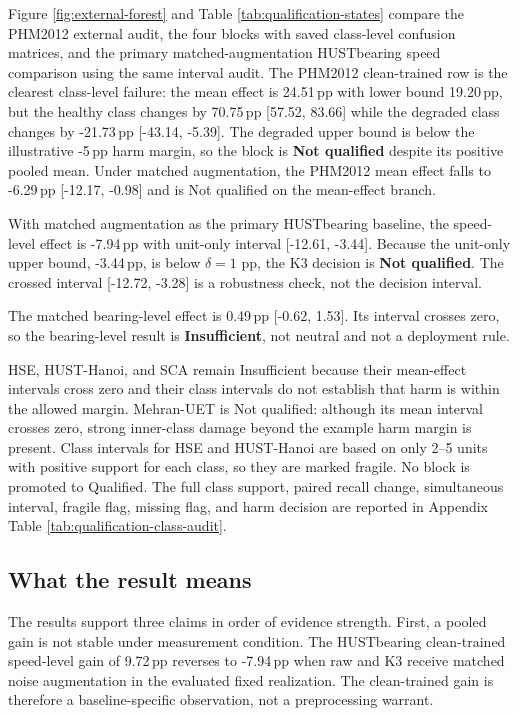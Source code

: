 \documentclass[11pt]{article}
\newcommand{\SI}[2]{#1\,\ensuremath{#2}}
\newcommand{\pp}{\mathrm{pp}}
\begin{document}
Figure \ref{fig:external-forest} and Table
\ref{tab:qualification-states} compare the PHM2012 external audit, the four
blocks with saved class-level confusion matrices, and the primary
matched-augmentation HUSTbearing speed comparison using the same interval
audit.
The PHM2012 clean-trained row is the clearest class-level failure: the mean
effect is \SI{24.51}{\pp} with lower bound \SI{19.20}{\pp}, but the healthy
class changes by \SI{70.75}{\pp} [57.52, 83.66] while the degraded class
changes by \SI{-21.73}{\pp} [-43.14, -5.39]. The degraded upper bound is below
the illustrative \SI{-5}{\pp} harm margin, so the block is \textbf{Not
qualified} despite its positive pooled mean. Under matched augmentation, the
PHM2012 mean effect falls to \SI{-6.29}{\pp} [-12.17, -0.98] and is Not
qualified on the mean-effect branch.

With matched augmentation as the primary HUSTbearing baseline, the speed-level
effect is \SI{-7.94}{\pp} with unit-only interval [-12.61, -3.44]. Because the
unit-only upper bound, \SI{-3.44}{\pp}, is below $\delta=1$ pp, the K3 decision
is \textbf{Not qualified}. The crossed interval [-12.72, -3.28] is a robustness
check, not the decision interval.

The matched bearing-level effect is \SI{0.49}{\pp} [-0.62, 1.53]. Its interval
crosses zero, so the bearing-level result is \textbf{Insufficient}, not neutral
and not a deployment rule.

HSE, HUST-Hanoi, and SCA remain Insufficient because their mean-effect
intervals cross zero and their class intervals do not establish that harm is
within the allowed margin. Mehran-UET is Not qualified: although its mean
interval crosses zero, strong inner-class damage beyond the example harm margin
is present. Class intervals for HSE and HUST-Hanoi are based on only 2--5 units
with positive support for each class, so they are marked fragile. No block is
promoted to Qualified. The full class support, paired recall change,
simultaneous interval, fragile flag, missing flag, and harm decision are
reported in Appendix Table \ref{tab:qualification-class-audit}.

\subsection{What the result means}

The results support three claims in order of evidence strength. First, a
pooled gain is not stable under measurement condition. The HUSTbearing
clean-trained speed-level gain of \SI{9.72}{\pp} reverses to
\SI{-7.94}{\pp} when raw and K3 receive matched noise augmentation in the
evaluated fixed realization. The clean-trained gain is therefore a
baseline-specific observation, not a preprocessing warrant.
\end{document}
